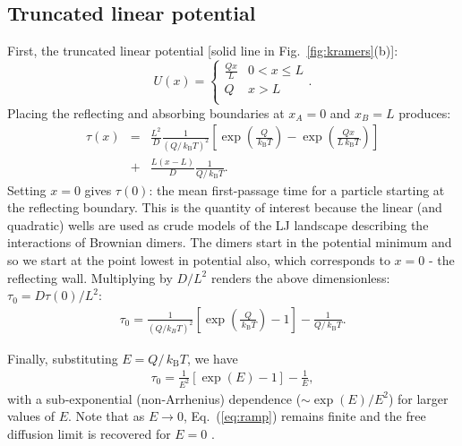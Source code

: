 \documentclass[twocolumn,pre,aps,showpacs,a4paper,floatfix,amssymb]{revtex4-1}
\newcommand{\kBT}{\,k_\mathrm{B}T}
\newcommand{\refeq}[1]{Eq.~(\ref{#1})}
\newcommand{\refig}[1]{Fig.~\ref{#1}}
\begin{document}
\subsection{Truncated linear potential}
\noindent First, the truncated linear potential [solid line in \refig{fig:kramers}(b)]:
\begin{equation}
U(x) = 
\begin{cases} 
\frac{Qx}{L} & 0 < x \leq L\\
Q & x > L \\
\end{cases}.
\label{eq:ramppot}
\end{equation}
 Placing the reflecting and absorbing boundaries at $x_A=0$ and $x_B=L$ produces:
\begin{eqnarray}
\tau(x)&=& \frac{L^2}{D}\frac{1}{(Q/\kBT)^2}  \left[ \exp\left(\frac{Q}{\kBT} \right) - \exp\left(\frac{Qx}{L\kBT} \right) \right] \nonumber \\ 
&+& \frac{L\left(x-L\right)}{D}\frac{1}{Q/\kBT}.
\end{eqnarray}
Setting $x=0$ gives $\tau(0)$: the mean first-passage time for a particle starting at the reflecting boundary. This is the quantity of interest because the linear (and quadratic) wells are used as crude models of the LJ landscape describing the interactions of Brownian dimers. The dimers start in the potential minimum and so we start at the point lowest in potential also, which corresponds to $x=0$ - the reflecting wall. Multiplying by $D/L^2$ renders the above dimensionless: $\tau_0 = D\tau(0)/L^2$:
\begin{eqnarray}
\tau_0=\frac{1}{\left(Q/k_BT\right)^2} \left[ \exp\left(\frac{Q}{\kBT} \right) - 1 \right]- \frac{1}{Q/\kBT}.
\nonumber
\end{eqnarray}

\noindent Finally, substituting $E=Q/\kBT$, we have
\begin{eqnarray}
\tau_0=\frac{1}{E^2} [\exp (E) - 1] - \frac{1}{E},
\label{eq:ramp}
\end{eqnarray}
with a sub-exponential (non-Arrhenius) dependence ($\sim \exp (E)/E^2$) for larger values of $E$. 
Note that as $E \rightarrow 0$, \refeq{eq:ramp} remains finite and the free diffusion limit is recovered for $E=0$
\cite{footnoteLimit}.
\end{document}
